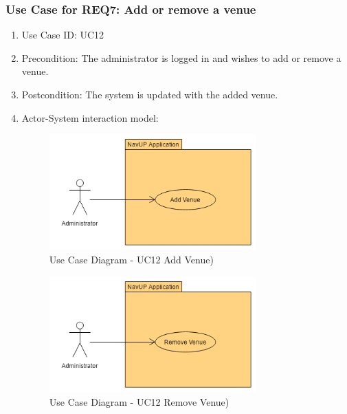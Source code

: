 \documentclass[11pt, a4paper]{article}
\begin{document}
		
		\newpage
		\subsubsection{Use Case for REQ7: Add or remove a venue}
			\begin{enumerate}
			\renewcommand{\labelenumi}{{\textbf{\arabic{enumi}.}}}
			\item Use Case ID: UC12
			\item Precondition: The administrator is logged in and wishes to add or remove a venue.
			\item Postcondition: The system is updated with the added venue.
			\item Actor-System interaction model:
				\graphicspath{ {./Images/Administrator/} }
				\begin{figure}[h]
				\caption{Use Case Diagram - UC12 Add Venue)}
				\includegraphics[width = 300px]{AddVenue.png}
				\end{figure}
		
				\graphicspath{ {./Images/Administrator/} }
				\begin{figure}[h]
				\caption{Use Case Diagram - UC12 Remove Venue)}
				\includegraphics[width = 300px]{RemoveVenue.png}
				\end{figure}
			\end{enumerate}
\end{document}
